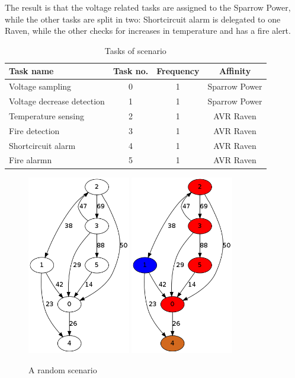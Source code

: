 The result is that the voltage related tasks are assigned to the Sparrow Power, while the other tasks are split in two:
Shortcircuit alarm is delegated to one Raven, while the other checks for increases in temperature and has a fire alert.



\begin{table}[ht]
 \centering
\begin{tabular}{|l|c|c|c|}
\hline
Task name & Task no. & Frequency & Affinity\\
\hline
Voltage sampling & 0 & 1 & Sparrow Power\\
\hline
Voltage decrease detection & 1 & 1 & Sparrow Power\\
\hline
Temperature sensing & 2 & 1 & AVR Raven \\
\hline
Fire detection & 3 & 1 & AVR Raven \\
\hline
Shortcircuit alarm & 4 & 1 & AVR Raven  \\
\hline
Fire alarmn & 5 & 1 & AVR Raven \\
\hline
\end{tabular}
\caption{Tasks of scenario}
\label{tab:scenario}
\end{table}

\begin{figure}
  \centering
  \label{fig:rand1}\includegraphics[width=0.4\textwidth]{scenario/rand1.png}
  \label{fig:rand2}\includegraphics[width=0.4\textwidth]{scenario/rand2.png}
  \caption{A random scenario}
\end{figure}